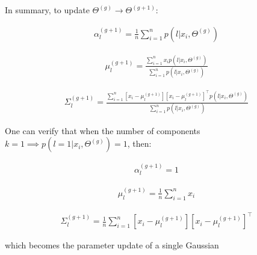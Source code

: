 \documentclass{article}
\begin{document}
In summary, to update $\Theta^{(g)} \rightarrow \Theta^{(g+1)}$:

\begin{equation}\begin{split}
\alpha_l^{(g+1)} = \frac{1}{n} \sum_{i=1}^n p (l | x_i, \Theta^{(g)})
\end{split}\end{equation}

\begin{equation}\begin{split}
\mu_l^{(g+1)} = \frac{\sum_{i=1}^n x_i p (l | x_i, \Theta^{(g)})}{\sum_{i=1}^n p (l | x_i, \Theta^{(g)})}
\end{split}\end{equation}

\begin{equation}\begin{split}
\Sigma_l^{(g+1)} = \frac{\sum_{i=1}^n [x_i - \mu_l^{(g+1)}] [ x_i - \mu_l^{(g+1)} ]^\top p (l | x_i, \Theta^{(g)})}{\sum_{i=1}^n p (l | x_i, \Theta^{(g)})}
\end{split}\end{equation}

One can verify that when the number of components $k = 1 \implies p (l=1 | x_i, \Theta^{(g)}) = 1$, then:

\begin{equation}\begin{split}
\alpha_l^{(g+1)} = 1
\end{split}\end{equation}

\begin{equation}\begin{split}
\mu_l^{(g+1)} = \frac{1}{n }\sum_{i=1}^n x_i
\end{split}\end{equation}

\begin{equation}\begin{split}
\Sigma_l^{(g+1)} = \frac{1}{n} \sum_{i=1}^n [x_i - \mu_l^{(g+1)}] [ x_i - \mu_l^{(g+1)} ]^\top
\end{split}\end{equation}

which becomes the parameter update of a single Gaussian

\end{document}
